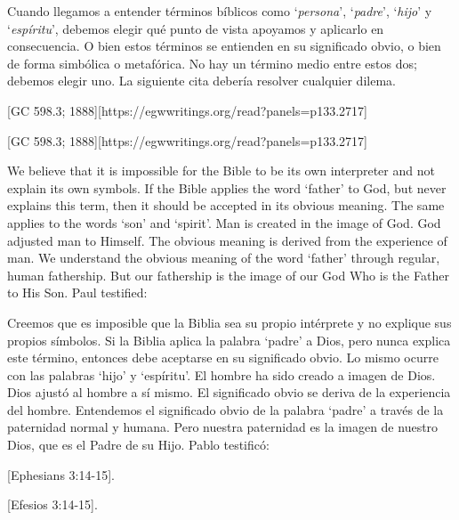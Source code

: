 Cuando llegamos a entender términos bíblicos como ‘\textit{persona}’, ‘\textit{padre}’, ‘\textit{hijo}’ y ‘\textit{espíritu}’, debemos elegir qué punto de vista apoyamos y aplicarlo en consecuencia. O bien estos términos se entienden en su significado obvio, o bien de forma simbólica o metafórica. No hay un término medio entre estos dos; debemos elegir uno. La siguiente cita debería resolver cualquier dilema.


[GC 598.3; 1888][https://egwwritings.org/read?panels=p133.2717]


[GC 598.3; 1888][https://egwwritings.org/read?panels=p133.2717]


We believe that it is impossible for the Bible to be its own interpreter and not explain its own symbols. If the Bible applies the word ‘father’ to God, but never explains this term, then it should be accepted in its obvious meaning. The same applies to the words ‘son’ and ‘spirit’. Man is created in the image of God. God adjusted man to Himself. The obvious meaning is derived from the experience of man. We understand the obvious meaning of the word ‘father’ through regular, human fathership. But our fathership is the image of our God Who is the Father to His Son. Paul testified:


Creemos que es imposible que la Biblia sea su propio intérprete y no explique sus propios símbolos. Si la Biblia aplica la palabra ‘padre’ a Dios, pero nunca explica este término, entonces debe aceptarse en su significado obvio. Lo mismo ocurre con las palabras ‘hijo’ y ‘espíritu’. El hombre ha sido creado a imagen de Dios. Dios ajustó al hombre a sí mismo. El significado obvio se deriva de la experiencia del hombre. Entendemos el significado obvio de la palabra ‘padre’ a través de la paternidad normal y humana. Pero nuestra paternidad es la imagen de nuestro Dios, que es el Padre de su Hijo. Pablo testificó:


[Ephesians 3:14-15].


[Efesios 3:14-15].


